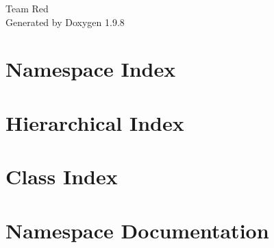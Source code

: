 \documentclass[twoside]{book}
\newcommand{\+}{\discretionary{\mbox{\scriptsize$\hookleftarrow$}}{}{}}
\newcommand{\clearemptydoublepage}{%
    \newpage{\pagestyle{empty}\cleardoublepage}%
  }
\begin{document}
  \raggedbottom
    \hypersetup{pageanchor=false,
                bookmarksnumbered=true,
                pdfencoding=unicode
               }
  \begin{titlepage}
  \vspace*{7cm}
  \begin{center}%
  {\Large Team Red}\\
  \vspace*{1cm}
  {\large Generated by Doxygen 1.9.8}\\
  \end{center}
  \end{titlepage}
  \clearemptydoublepage
  \tableofcontents
  \clearemptydoublepage
  \hypersetup{pageanchor=true}



\chapter{Namespace Index}

\chapter{Hierarchical Index}

\chapter{Class Index}

\chapter{Namespace Documentation}







\end{document}
